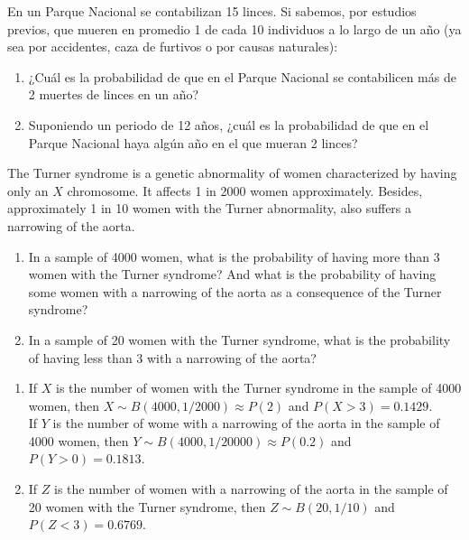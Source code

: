 {En un Parque Nacional se contabilizan 15 linces. Si sabemos, por estudios previos, que mueren en promedio 1 de cada 10 individuos a lo largo de un año (ya sea por accidentes, caza de furtivos o por causas naturales):
\begin{enumerate}
\item ¿Cuál es la probabilidad de que en el Parque Nacional se contabilicen más de 2 muertes de linces en un año?
\item Suponiendo un periodo de 12 años, ¿cuál es la probabilidad de que en el Parque Nacional haya algún año
en el que mueran 2 linces?
\end{enumerate}
}
{}
{}


{The Turner syndrome is a genetic abnormality of women characterized by having only an $X$ chromosome.
It affects 1 in 2000 women approximately.
Besides, approximately 1 in 10 women with the Turner abnormality, also suffers a narrowing of the aorta.
\begin{enumerate}
\item In a sample of 4000 women, what is the probability of having more than 3 women with the Turner syndrome?
And what is the probability of having some women with a narrowing of the aorta as a consequence of the Turner syndrome?
\item In a sample of 20 women with the Turner syndrome, what is the probability of having less than 3 with a narrowing of the aorta?
\end{enumerate}
}
{
\begin{enumerate}
\item If $X$ is the number of women with the Turner syndrome in the sample of 4000 women, then $X\sim
B(4000,1/2000)\approx P(2)$ and $P(X>3)=0.1429$.\\
If $Y$ is the number of wome with a narrowing of the aorta in the sample of 4000 women, then $Y\sim
B(4000,1/20000)\approx P(0.2)$ and $P(Y>0)=0.1813$.
\item If $Z$ is the number of women with a narrowing of the aorta in the sample of 20 women with the Turner syndrome, then $Z\sim B(20,1/10)$ and $P(Z<3)=0.6769$.
\end{enumerate}
}
{}


